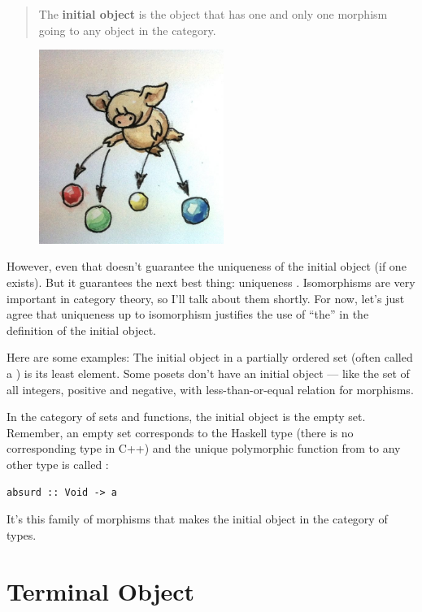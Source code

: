 \begin{quote}
The \textbf{initial object} is the object that has one and only one
morphism going to any object in the category.
\end{quote}

\begin{figure}[H]
\centering
\includegraphics[width=60mm]{images/initial.jpg}
\end{figure}

\noindent
However, even that doesn't guarantee the uniqueness of the initial
object (if one exists). But it guarantees the next best thing:
uniqueness . Isomorphisms are very important in
category theory, so I'll talk about them shortly. For now, let's just
agree that uniqueness up to isomorphism justifies the use of ``the'' in
the definition of the initial object.

Here are some examples: The initial object in a partially ordered set
(often called a ) is its least element. Some posets don't
have an initial object --- like the set of all integers, positive and
negative, with less-than-or-equal relation for morphisms.

In the category of sets and functions, the initial object is the empty
set. Remember, an empty set corresponds to the Haskell type
 (there is no corresponding type in C++) and the unique
polymorphic function from  to any other type is called
:

\begin{Verbatim}
absurd :: Void -> a
\end{Verbatim}
It's this family of morphisms that makes  the initial
object in the category of types.

\section{Terminal Object}

